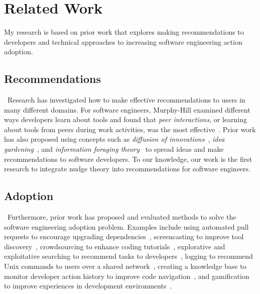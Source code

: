 \section{Related Work}

My research is based on prior work that explores making recommendations to developers and technical approaches to increasing software engineering action adoption.

\subsection{Recommendations} 

\reword~Research has investigated how to make effective recommendations to users in many different domains. For software engineers, Murphy-Hill examined different ways developers learn about tools and found that \textit{peer interactions}, or learning about tools from peers during work activities, was the most effective~\cite{Murphy-Hill2011PeerInteraction}. Prior work has also proposed using concepts such as \textit{diffusion of innovations}~\cite{Diffusion}, \textit{idea gardening}~\cite{CaoIdeaGarden}, and \textit{information foraging theory}~\cite{FlemingInformationForaging} to spread ideas and make recommendations to software developers. To our knowledge, our work is the first research to integrate nudge theory into recommendations for software engineers. \details

\subsection{Adoption} 

\reword~Furthermore, prior work has proposed and evaluated methods to solve the software engineering adoption problem. Examples include using automated pull requests to encourage upgrading dependencies~\cite{SamUgrade}, screencasting to improve tool discovery~\cite{Murphy-HillScreencastingDiscovery}, crowdsourcing to enhance coding tutorials~\cite{gordon2015codepourri}, explorative and exploitative searching to recommend tasks to developers~\cite{karim2018learn}, logging to recommend Unix commands to users over a shared network~\cite{ToolBox}, creating a knowledge base to monitor developer action history to improve code navigation~\cite{Spyglass}, and gamification to improve experiences in development environments~\cite{barik2016game}. \details
